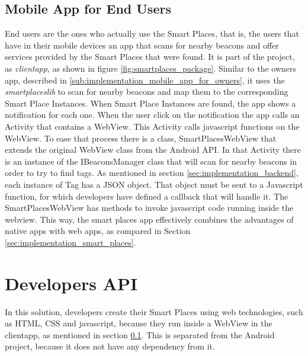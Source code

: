 \subsection{Mobile App for End Users}
\label{sub:implementation_mobile_app_for_end_users}
End users are the ones who actually use the Smart Places, that is, the users that have in their mobile devices an app that scans for nearby beacons and offer services provided by the Smart Places that were found.
It is part of the project, as \emph{clientapp}, as shown in figure \ref{fig:smartplaces_package}. Similar to the owners app, described in \ref{sub:implementation_mobile_app_for_owners}, it uses the \emph{smartplaceslib} to scan for nearby beacons and map them to the corresponding Smart Place Instances.
When Smart Place Instances are found, the app shows a notification for each one.
When the user click on the notification the app calls an Activity that contains a WebView. This Activity calls javascript functions on the WebView.
To ease that process there is a class, SmartPlacesWebView that extends the original WebView class from the Android \gls{API}.
In that Activity there is an instance of the IBeaconsManager class that will scan for nearby beacons in order to try to find tags. As mentioned in section \ref{sec:implementation_backend},
each instance of Tag has a \gls{JSON} object. That object must be sent to a Javascript function, for which developers have defined a callback that will handle it. The SmartPlacesWebView has methods to invoke javascript code running inside the webview.
This way, the smart places app effectively combines the advantages of native apps with web apps, as compared in Section \ref{sec:implementation_smart_places}.

\section{Developers API}
\label{sec:implementation_developers_api}
In this solution, developers create their Smart Places using web technologies, such as \gls{HTML}, \gls{CSS} and javascript, because they run inside a WebView in the clientapp, as mentioned in section \ref{sub:implementation_mobile_app_for_end_users}.
This is separated from the Android project, because it does not have any dependency from it.

